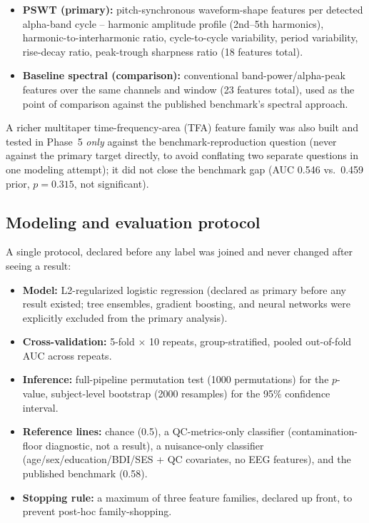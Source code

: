 \documentclass[11pt]{article}
\begin{document}
\begin{itemize}[leftmargin=1.2cm]
  \item \textbf{PSWT (primary):} pitch-synchronous waveform-shape
        features per detected alpha-band cycle -- harmonic amplitude
        profile (2nd--5th harmonics), harmonic-to-interharmonic ratio,
        cycle-to-cycle variability, period variability, rise-decay ratio,
        peak-trough sharpness ratio (18 features total).
  \item \textbf{Baseline spectral (comparison):} conventional
        band-power/alpha-peak features over the same channels and window
        (23 features total), used as the point of comparison against the
        published benchmark's spectral approach.
\end{itemize}

A richer multitaper time-frequency-area (TFA) feature family was also
built and tested in Phase~5 \emph{only} against the benchmark-reproduction
question (never against the primary target directly, to avoid conflating
two separate questions in one modeling attempt); it did not close the
benchmark gap (AUC 0.546 vs.\ 0.459 prior, $p=0.315$, not significant).

\subsection{Modeling and evaluation protocol}

A single protocol, declared before any label was joined and never changed
after seeing a result:

\begin{itemize}[leftmargin=1.2cm]
  \item \textbf{Model:} L2-regularized logistic regression (declared as
        primary before any result existed; tree ensembles, gradient
        boosting, and neural networks were explicitly excluded from the
        primary analysis).
  \item \textbf{Cross-validation:} 5-fold $\times$ 10 repeats,
        group-stratified, pooled out-of-fold AUC across repeats.
  \item \textbf{Inference:} full-pipeline permutation test (1000
        permutations) for the $p$-value, subject-level bootstrap (2000
        resamples) for the 95\% confidence interval.
  \item \textbf{Reference lines:} chance (0.5), a QC-metrics-only
        classifier (contamination-floor diagnostic, not a result), a
        nuisance-only classifier (age/sex/education/BDI/SES + QC
        covariates, no EEG features), and the published benchmark (0.58).
  \item \textbf{Stopping rule:} a maximum of three feature families,
        declared up front, to prevent post-hoc family-shopping.
\end{itemize}
\end{document}
